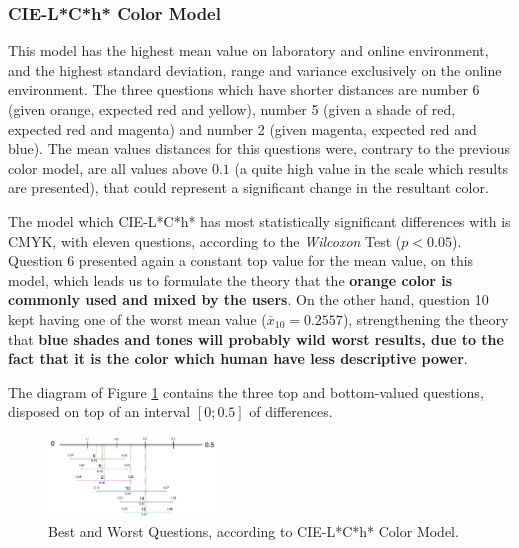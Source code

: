 \subsubsection{CIE-L*C*h* Color Model}
%
This model has the highest mean value on laboratory and online environment, and the highest standard
deviation, range and variance exclusively on the online environment. The three questions which have
shorter distances are number 6 (given orange, expected red and yellow), number 5 (given a shade of
red, expected red and magenta) and number 2 (given magenta, expected red and blue). The mean values
distances for this questions were, contrary to the previous color model, are all values above $0.1$
(a quite high value in the scale which results are presented), that could represent a significant
change in the resultant color. \par
%
The model which CIE-L*C*h* has most statistically significant differences with is CMYK, with eleven
questions, according to the \emph{Wilcoxon} Test ($p < 0.05$). Question 6 presented again a constant
top value for the mean value, on this model, which leads us to formulate the theory that the
\textbf{orange color is commonly used and mixed by the users}. On the other hand, question 10 kept
having one of the worst mean value ($\overline{x}_{10} = 0.2557$), strengthening the theory that
\textbf{blue shades and tones will probably wild worst results, due to the fact that it is the color
which human have less descriptive power}. \par
%
The diagram of Figure \ref{fig:lch_analysis} contains the three top and bottom-valued questions,
disposed on top of an interval $[0 ; 0.5]$ of differences.
%
\begin{figure}[!htbp]
  \centering
  \includegraphics[width=0.4\textwidth]{images/lch_questions_analysis.png}
  \caption{Best and Worst Questions, according to CIE-L*C*h* Color Model.}
  \label{fig:lch_analysis}
\end{figure}
%
